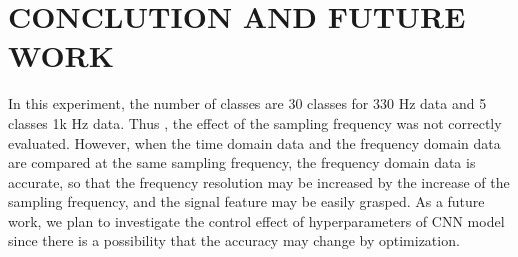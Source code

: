 \documentclass[letterpaper,  10 pt,  conference]{ieeeconf}  %
\begin{document}
\section{CONCLUTION AND FUTURE WORK}

In this experiment,  the number of classes are 30 classes for 330 Hz data and 5 classes 1k Hz data. Thus , the effect of the sampling frequency was not correctly evaluated.  
However,  when the time domain data and the frequency domain data are compared at the same sampling frequency,  the frequency domain data is accurate,  so that the frequency 
resolution may be increased by the increase of the sampling frequency,  and the signal feature may be easily grasped. As a future work,  we plan to investigate the control 
effect of hyperparameters of CNN model since there is a possibility that the accuracy may change by optimization. 






\addtolength{\textheight}{-12cm}  %
\end{document}
